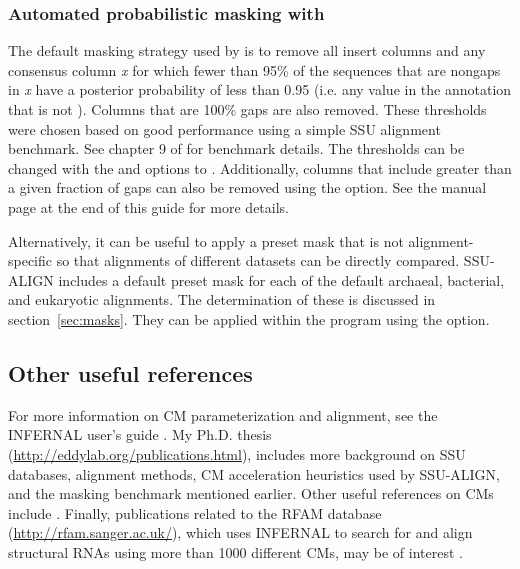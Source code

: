 \subsubsection{Automated probabilistic masking with }

The default masking strategy used by  is to remove all
insert columns and any consensus column \emph{x} for which fewer than 95\% of
the sequences that are nongaps in \emph{x} have a posterior
probability of less than 0.95 (i.e. any value in the 
annotation that is not \prog{*}). Columns that are 100\% gaps are also
removed. These thresholds were chosen based on good performance using
a simple SSU alignment benchmark. See chapter 9 of \cite{Nawrocki09} for
benchmark details. The thresholds can be changed with the  and
 options to . Additionally, columns that include
greater than a given fraction of gaps can also be removed using the
 option. See the  manual page at the
end of this guide for more details.

Alternatively, it can be useful to apply a preset mask that is not
alignment-specific so that alignments of different datasets can be
directly compared. SSU-ALIGN includes a default preset mask for
each of the default archaeal, bacterial, and eukaryotic
alignments. The determination of these is discussed in
section~\ref{sec:masks}. They can be applied within the
 program using the  option.

\subsection{Other useful references}

For more information on CM parameterization and alignment, see the
INFERNAL user's guide \cite{infernalguide}.  My
Ph.D. thesis (\url{http://eddylab.org/publications.html}),
includes more background on SSU databases, alignment methods, CM
acceleration heuristics used by SSU-ALIGN, and the masking
benchmark mentioned earlier. Other useful references on CMs include
\cite{Eddy94,Eddy02b,NawrockiEddy07,Nawrocki09,KolbeEddy09}. Finally,
publications related to the RFAM database
(\url{http://rfam.sanger.ac.uk/}),
which uses INFERNAL to search for and align structural RNAs
using more than 1000 different CMs, may be of interest
\cite{Griffiths-Jones03,Griffiths-Jones05,Gardner09}.


